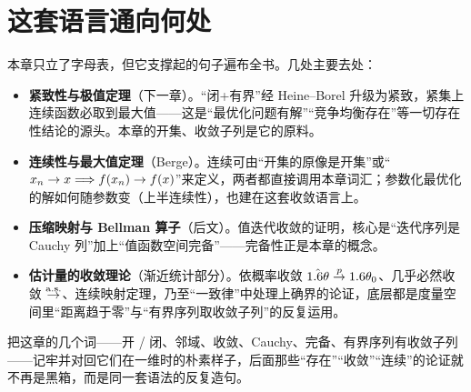 

\section{这套语言通向何处}
\label{sec:metric-beyond}

本章只立了字母表，但它支撑起的句子遍布全书。几处主要去处：

\begin{itemize}
    \item \textbf{紧致性与极值定理}（下一章）。``闭+有界''经 Heine--Borel 升级为紧致，紧集上连续函数必取到最大值——这是``最优化问题有解''``竞争均衡存在''等一切存在性结论的源头。本章的开集、收敛子列是它的原料。
    \item \textbf{连续性与最大值定理}（Berge）。连续可由``开集的原像是开集''或``$x_n\to x\Longrightarrow f(x_n)\to f(x)$''来定义，两者都直接调用本章词汇；参数化最优化的解如何随参数变（上半连续性），也建在这套收敛语言上。
    \item \textbf{压缩映射与 Bellman 算子}（后文）。值迭代收敛的证明，核心是``迭代序列是 Cauchy 列''加上``值函数空间完备''——完备性正是本章的概念。
    \item \textbf{估计量的收敛理论}（渐近统计部分）。依概率收敛 $\hat{1.6\theta}\overset{p}{\to}1.6\theta_0$、几乎必然收敛 $\overset{\mathrm{a.s.}}{\to}$、连续映射定理，乃至``一致律''中处理上确界的论证，底层都是度量空间里``距离趋于零''与``有界序列取收敛子列''的反复运用。
\end{itemize}

把这章的几个词——开 / 闭、邻域、收敛、Cauchy、完备、有界序列有收敛子列——记牢并对回它们在一维时的朴素样子，后面那些``存在''``收敛''``连续''的论证就不再是黑箱，而是同一套语法的反复造句。
